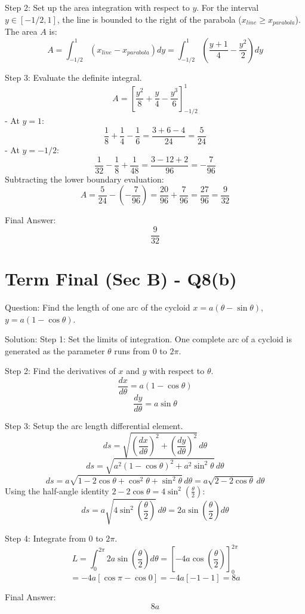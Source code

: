 \documentclass{article}
\begin{document}
Step 2: Set up the area integration with respect to $y$.
For the interval $y \in [-1/2, 1]$, the line is bounded to the right of the parabola ($x_{line} \ge x_{parabola}$).
The area $A$ is:
\[
A = \int_{-1/2}^1 \left( x_{line} - x_{parabola} \right) dy = \int_{-1/2}^1 \left( \frac{y+1}{4} - \frac{y^2}{2} \right) dy
\]

Step 3: Evaluate the definite integral.
\[
A = \left[ \frac{y^2}{8} + \frac{y}{4} - \frac{y^3}{6} \right]_{-1/2}^1
\]
- At $y = 1$:
  \[
  \frac{1}{8} + \frac{1}{4} - \frac{1}{6} = \frac{3 + 6 - 4}{24} = \frac{5}{24}
  \]
- At $y = -1/2$:
  \[
  \frac{1}{32} - \frac{1}{8} + \frac{1}{48} = \frac{3 - 12 + 2}{96} = -\frac{7}{96}
  \]
Subtracting the lower boundary evaluation:
\[
A = \frac{5}{24} - \left(-\frac{7}{96}\right) = \frac{20}{96} + \frac{7}{96} = \frac{27}{96} = \frac{9}{32}
\]

Final Answer:
\[
\boxed{\frac{9}{32}}
\]

\section*{Term Final (Sec B) - Q8(b)}
Question:
Find the length of one arc of the cycloid $x = a(\theta - \sin\theta)$, $y = a(1 - \cos\theta)$.

Solution:
Step 1: Set the limits of integration.
One complete arc of a cycloid is generated as the parameter $\theta$ runs from $0$ to $2\pi$.

Step 2: Find the derivatives of $x$ and $y$ with respect to $\theta$.
\[
\frac{dx}{d\theta} = a(1 - \cos\theta)
\]
\[
\frac{dy}{d\theta} = a\sin\theta
\]

Step 3: Setup the arc length differential element.
\[
ds = \sqrt{ \left(\frac{dx}{d\theta}\right)^2 + \left(\frac{dy}{d\theta}\right)^2 } \, d\theta
\]
\[
ds = \sqrt{ a^2(1 - \cos\theta)^2 + a^2\sin^2\theta } \, d\theta
\]
\[
ds = a \sqrt{ 1 - 2\cos\theta + \cos^2\theta + \sin^2\theta } \, d\theta = a\sqrt{2 - 2\cos\theta} \, d\theta
\]
Using the half-angle identity $2 - 2\cos\theta = 4\sin^2\left(\frac{\theta}{2}\right)$:
\[
ds = a \sqrt{4\sin^2\left(\frac{\theta}{2}\right)} \, d\theta = 2a\sin\left(\frac{\theta}{2}\right) d\theta
\]

Step 4: Integrate from $0$ to $2\pi$.
\[
L = \int_0^{2\pi} 2a \sin\left(\frac{\theta}{2}\right) d\theta = \left[ -4a \cos\left(\frac{\theta}{2}\right) \right]_0^{2\pi}
\]
\[
= -4a [\cos\pi - \cos 0] = -4a [-1 - 1] = 8a
\]

Final Answer:
\[
\boxed{8a}
\]
\end{document}
